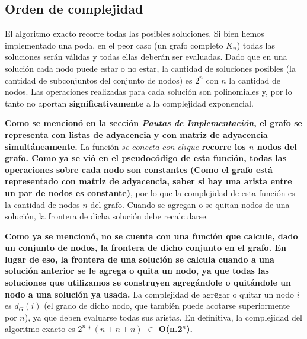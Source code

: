 {\color{dGray}\subsection{Orden de complejidad}}

\par{{\color{dGray}El algoritmo exacto recorre todas las posibles soluciones.
Si bien hemos implementado una poda, en el peor caso (un grafo completo $K_n$)
todas las soluciones serán válidas y todas ellas deberán ser evaluadas. Dado que
en una solución cada nodo puede estar o no estar, la cantidad de soluciones
posibles (la cantidad de subconjuntos del conjunto de nodos) es $2^n$ con
$n$ la cantidad de nodos. Las operaciones realizadas para cada solución son
polinomiales y, por lo tanto no aportan} \textbf{significativamente}
{\color{dGray}a la complejidad exponencial.}}\\

\par{\textbf{Como se mencionó en la
sección \textit{Pautas de Implementación}, el grafo se representa con listas
de adyacencia y con matriz de adyacencia simultáneamente.} {\color{dGray}La
función $se\_conecta\_con\_clique$} \textbf{recorre los $n$ nodos del grafo.
Como ya se vió en el pseudocódigo de esta función, todas las operaciones sobre
cada nodo son constantes} \textbf{(Como el grafo está representado con matriz de
adyacencia, saber si hay una arista entre un par de nodos es
constante)}{\color{dGray}, por lo que la complejidad de esta función es la
cantidad de nodos $n$ del grafo. Cuando se agregan o se quitan nodos de una
solución, la frontera de dicha solución debe recalcularse.}}\\

\par{\textbf{Como ya se mencionó, no se cuenta con una función que
calcule, dado un conjunto de nodos, la frontera de dicho conjunto en
el grafo. En lugar de eso, la frontera de una solución se calcula cuando
a una solución anterior se le agrega o quita un nodo, ya que todas
las soluciones que utilizamos se construyen agregándole
o quitándole un nodo a una solución ya usada.} {\color{dGray}La complejidad de
agr}\textbf{e}{\color{dGray}gar o quitar un nodo $i$ es $d_G(i)$ (el grado de
dicho nodo, que también puede acotarse superiormente por $n$), ya que deben
evaluarse todas sus aristas. En definitiva, la complejidad del algoritmo exacto
es $2^n * ( n + n + n )$} \textbf{$\in$ O(n.2$^n$).}}

